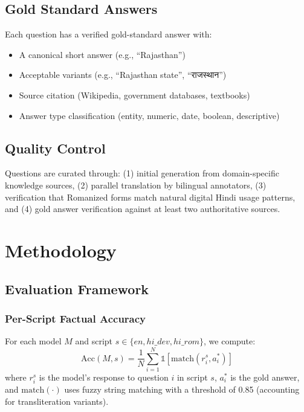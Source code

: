 \documentclass[11pt,a4paper]{article}
\begin{document}
\subsection{Gold Standard Answers}
Each question has a verified gold-standard answer with:
\begin{itemize}
    \item A canonical short answer (e.g., ``Rajasthan'')
    \item Acceptable variants (e.g., ``Rajasthan state'', ``राजस्थान'')
    \item Source citation (Wikipedia, government databases, textbooks)
    \item Answer type classification (entity, numeric, date, boolean, descriptive)
\end{itemize}

\subsection{Quality Control}
Questions are curated through: (1) initial generation from domain-specific knowledge sources, (2) parallel translation by bilingual annotators, (3) verification that Romanized forms match natural digital Hindi usage patterns, and (4) gold answer verification against at least two authoritative sources.

\section{Methodology}
\label{sec:method}

\subsection{Evaluation Framework}

\subsubsection{Per-Script Factual Accuracy}
For each model $M$ and script $s \in \{en, hi\_dev, hi\_rom\}$, we compute:
\begin{equation}
    \text{Acc}(M, s) = \frac{1}{N} \sum_{i=1}^{N} \mathbb{1}[\text{match}(r_i^s, a_i^*)]
\end{equation}
where $r_i^s$ is the model's response to question $i$ in script $s$, $a_i^*$ is the gold answer, and $\text{match}(\cdot)$ uses fuzzy string matching with a threshold of 0.85 (accounting for transliteration variants).
\end{document}
